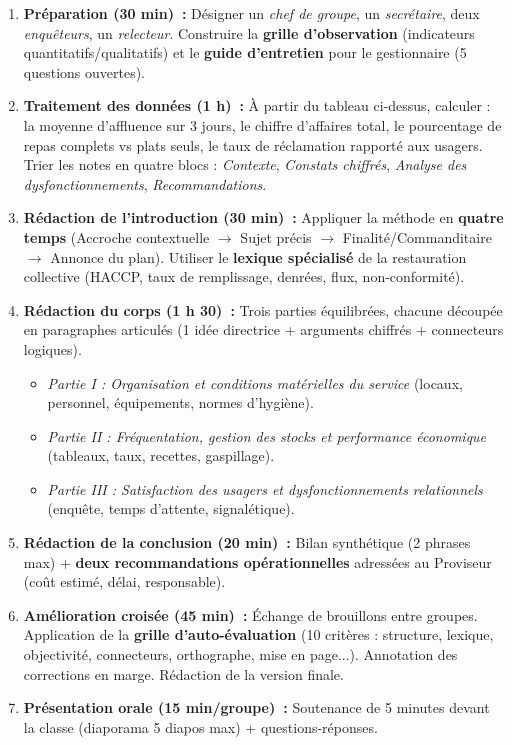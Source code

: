 \documentclass[11pt]{article}
\begin{document}
\begin{enumerate}
    \item \textbf{Préparation (30 min)~:} Désigner un \textit{chef de groupe}, un \textit{secrétaire}, deux \textit{enquêteurs}, un \textit{relecteur}. Construire la \textbf{grille d'observation} (indicateurs quantitatifs/qualitatifs) et le \textbf{guide d'entretien} pour le gestionnaire (5 questions ouvertes).
    \item \textbf{Traitement des données (1 h)~:} À partir du tableau ci-dessus, calculer : la moyenne d'affluence sur 3 jours, le chiffre d'affaires total, le pourcentage de repas complets vs plats seuls, le taux de réclamation rapporté aux usagers. Trier les notes en quatre blocs : \textit{Contexte}, \textit{Constats chiffrés}, \textit{Analyse des dysfonctionnements}, \textit{Recommandations}.
    \item \textbf{Rédaction de l'introduction (30 min)~:} Appliquer la méthode en \textbf{quatre temps} (Accroche contextuelle $\rightarrow$ Sujet précis $\rightarrow$ Finalité/Commanditaire $\rightarrow$ Annonce du plan). Utiliser le \textbf{lexique spécialisé} de la restauration collective (HACCP, taux de remplissage, denrées, flux, non-conformité).
    \item \textbf{Rédaction du corps (1 h 30)~:} Trois parties équilibrées, chacune découpée en paragraphes articulés (1 idée directrice + arguments chiffrés + connecteurs logiques).
        \begin{itemize}
            \item \textit{Partie I : Organisation et conditions matérielles du service} (locaux, personnel, équipements, normes d'hygiène).
            \item \textit{Partie II : Fréquentation, gestion des stocks et performance économique} (tableaux, taux, recettes, gaspillage).
            \item \textit{Partie III : Satisfaction des usagers et dysfonctionnements relationnels} (enquête, temps d'attente, signalétique).
        \end{itemize}
    \item \textbf{Rédaction de la conclusion (20 min)~:} Bilan synthétique (2 phrases max) + \textbf{deux recommandations opérationnelles} adressées au Proviseur (coût estimé, délai, responsable).
    \item \textbf{Amélioration croisée (45 min)~:} Échange de brouillons entre groupes. Application de la \textbf{grille d'auto-évaluation} (10 critères : structure, lexique, objectivité, connecteurs, orthographe, mise en page...). Annotation des corrections en marge. Rédaction de la version finale.
    \item \textbf{Présentation orale (15 min/groupe)~:} Soutenance de 5 minutes devant la classe (diaporama 5 diapos max) + questions-réponses.
\end{enumerate}
\end{document}
